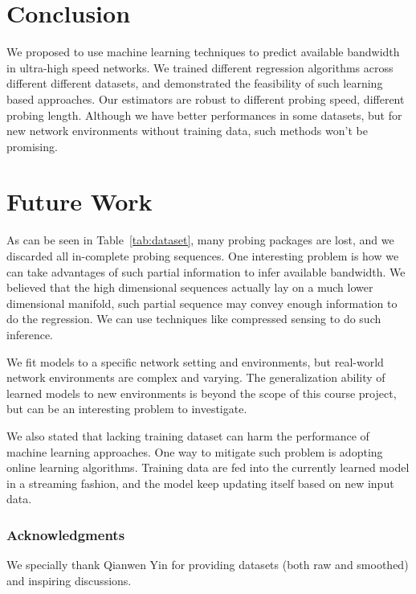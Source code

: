 \section{Conclusion}
\label{sec:conclusion}
We proposed to use machine learning techniques to predict available bandwidth
in ultra-high speed networks. We trained different regression algorithms across
different different datasets, and demonstrated the feasibility of such learning
based approaches. Our estimators are robust to different probing speed,
different probing length. Although we have better performances in some
datasets, but for new network environments without training data, such methods
won't be promising.

\section{Future Work}
\label{sec:future_work}
As can be seen in Table~\ref{tab:dataset}, many probing packages are lost, and
we discarded all in-complete probing sequences. One interesting problem is how
we can take advantages of such partial information to infer available
bandwidth. We believed that the high dimensional sequences actually lay on a
much lower dimensional manifold, such partial sequence may convey enough
information to do the regression. We can use techniques like compressed
sensing\cite{donoho2006compressed} to do such inference.

We fit models to a specific network setting and environments, but real-world
network environments are complex and varying. The generalization ability of
learned models to new environments is beyond the scope of this course project,
but can be an interesting problem to investigate.

We also stated that lacking training dataset can harm the performance of
machine learning approaches. One way to mitigate such problem is adopting
online learning algorithms. Training data are fed into the currently learned
model in a streaming fashion, and the model keep updating itself based on new input data.

\subsubsection*{Acknowledgments}

We specially thank Qianwen Yin for providing datasets (both raw and smoothed)
and inspiring discussions.
